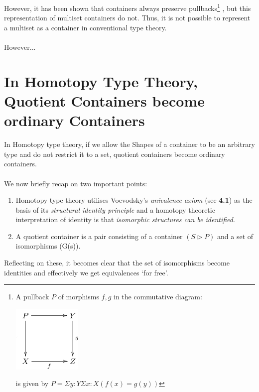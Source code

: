 \documentclass[12pt]{report}
\begin{document}
\pagebreak
 However, it has been shown that containers always preserve pullbacks\cite{ghani1}\footnote{
A pullback $P$ of morphisms $f,g$ in the commutative diagram:
\begin{center}
\includegraphics[scale=0.6]{pullback.png}
\end{center}
is given by $P = \Sigma y:Y\Sigma x:X (f(x)=g(y))$
}
, but this representation of multiset containers do not\cite{lyon}. Thus, it is not possible to represent a multiset as a container in conventional type theory.\\
\\
However...

\chapter{In Homotopy Type Theory, Quotient Containers become ordinary Containers}
In Homotopy type theory, if we allow the Shapes of a container to be an arbitrary type and do not restrict it to a set, quotient containers become ordinary containers. \\
\\
We now briefly recap on two important points:
\begin{enumerate}
\item Homotopy type theory utilises Voevodsky's \textit{univalence axiom} (see \textbf{4.1}) as the basis of its \textit{structural identity principle} and a homotopy theoretic interpretation of identity is that \textit{isomorphic structures can be identified}.

\item A quotient container is a pair consisting of a container $(S \rhd P)$ and a set of isomorphisms (G(s)).
\end{enumerate}
Reflecting on these, it becomes clear that the set of isomorphisms become identities and effectively we get equivalences `for free'. 
\end{document}
